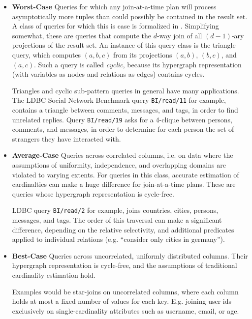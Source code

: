 \documentclass[../catalog.tex]{subfiles}
\begin{document}
\begin{itemize}

  \item \textbf{Worst-Case} Queries for which any join-at-a-time plan
    will process asymptotically more tuples than could possibly be
    contained in the result set. A class of queries for which this is
    case is formalized in \cite{ngo2012worst}. Simplifying somewhat,
    these are queries that compute the $d$-way join of all $(d-1)$-ary
    projections of the result set. An instance of this query class is
    the triangle query, which computes $(a,b,c)$ from its projections
    $(a,b)$, $(b,c)$, and $(a,c)$. Such a query is called
    \emph{cyclic}, because its hypergraph representation (with
    variables as nodes and relations as edges) contains cycles.

    Triangles and cyclic sub-pattern queries in general have many
    applications. The LDBC Social Network Benchmark query
    \texttt{BI/read/11} for example, contains a triangle between
    comments, messages, and tags, in order to find unrelated
    replies. Query \texttt{BI/read/19} asks for a 4-clique between
    persons, comments, and messages, in order to determine for each
    person the set of strangers they have interacted with.

  \item \textbf{Average-Case} Queries across correlated columns,
    i.e. on data where the assumptions of uniformity, independence,
    and overlapping domains are violated to varying extents. For
    queries in this class, accurate estimation of cardinalties can
    make a huge difference for join-at-a-time plans. These are queries
    whose hypergraph representation is cycle-free.

    LDBC query \texttt{BI/read/2} for example, joins countries,
    cities, persons, messages, and tags. The order of this traversal
    can make a significant difference, depending on the relative
    selectivity, and additional predicates applied to individual
    relations (e.g. ``consider only cities in germany'').

  \item \textbf{Best-Case} Queries across uncorrelated, uniformly
    distributed columns. Their hypergraph representation is
    cycle-free, and the assumptions of traditional cardinality
    estimation hold.

    Examples would be star-joins on uncorrelated columns, where each
    column holds at most a fixed number of values for each
    key. E.g. joining user ids exclusively on single-cardinality
    attributes such as username, email, or age.
    
\end{itemize}
\end{document}
